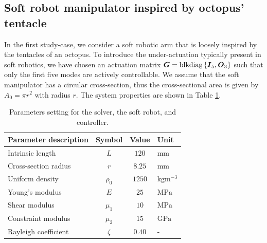 \subsection{Soft robot manipulator inspired by octopus' tentacle}
In the first study-case, we consider a soft robotic arm that is loosely inspired by the tentacles of an octopus. To introduce the under-actuation typically present in soft robotics, we have chosen an actuation matrix $\boldsymbol{G} = \textnormal{blkdiag}\left\{ {\boldsymbol{I}_5, \boldsymbol{O}_3} \right\}$ such that only the first five modes are actively controllable.  We assume that the soft manipulator has a circular cross-section, thus the cross-sectional area is given by $A_0 = \pi r^2$ with radius $r$. The system properties are shown in Table \ref{tab:C3:parameters1}.
%
\begin{table}[t]
  \vspace{-0.25cm}
  \caption{Parameters setting for the solver, the soft robot, and controller.}\label{tab:C3:parameters1} \centering
  \begin{tabular}{l|c|c|l}
    Parameter description & Symbol & Value & Unit \\
    \midrule
    Intrinsic length & $L $ & $ 120$ & mm \\
    Cross-section radius & $r $ & $ 8.25$ & $\text{mm}$ \\
    Uniform density & $\rho_0 $ & $ 1250$ & $\text{kg}\text{m}^{-3}$ \\
    Young's modulus & $E $ & $ 25$ & $\text{MPa}$ \\
    Shear modulus & $\mu_1 $ & $ 10 $ & $\text{MPa}$ \\
    Constraint modulus & $\mu_2 $ & $ 15 $ & $\text{GPa}$ \\
    Rayleigh coefficient & $\zeta $ & $ 0.40 $ & - \\
    \bottomrule
  \end{tabular}
  \vspace{-3mm}
  \end{table}
%

